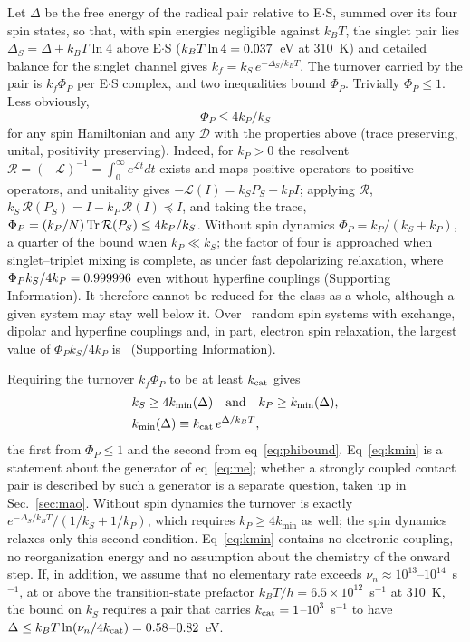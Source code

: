 \documentclass[aip,jcp,amsmath,amssymb,reprint]{revtex4-1}
\begin{document}
Let $\Delta$ be the free energy of the radical pair relative to E$\cdot$S, summed
over its four spin states, so that, with spin energies negligible against
$k_BT$, the singlet pair lies $\Delta_S = \Delta + k_BT\ln 4$ above E$\cdot$S
($k_BT\ln4 = 0.037$~eV at 310~K) and detailed balance for the singlet channel gives
$k_f = k_S\,e^{-\Delta_S/k_BT}$. The turnover carried by the pair is $k_f\Phi_P$
per E$\cdot$S complex, and two inequalities bound $\Phi_P$. Trivially
$\Phi_P\le1$. Less obviously,
\begin{equation}
\Phi_P \le 4k_P/k_S
\label{eq:phibound}
\end{equation}
for any spin Hamiltonian and any $\mathcal D$ with the properties above
(trace preserving, unital, positivity preserving). Indeed,
for $k_P>0$ the resolvent
$\mathcal R = (-\mathcal L)^{-1} = \int_0^\infty e^{\mathcal Lt}dt$ exists and
maps positive operators to positive operators, and unitality gives
$-\mathcal L(I) = k_SP_S + k_PI$; applying $\mathcal R$,
$k_S\,\mathcal R(P_S) = I - k_P\,\mathcal R(I) \preceq I$, and taking the trace,
$\Phi_P = (k_P/N)\,{\rm Tr}\,\mathcal R(P_S)\le 4k_P/k_S$. Without spin
dynamics $\Phi_P = k_P/(k_S+k_P)$, a quarter of the bound when $k_P\ll k_S$;
the factor of four is approached when singlet--triplet mixing is complete, as
under fast depolarizing relaxation, where $\Phi_Pk_S/4k_P = 0.999996$ even
without hyperfine couplings (Supporting Information). It therefore cannot be
reduced for the class as a whole, although a given system may stay well below
it. Over
\nBoundTest\ random spin systems with exchange, dipolar and hyperfine couplings
and, in part, electron spin relaxation, the largest value of $\Phi_Pk_S/4k_P$ is
\maxBoundRatio\ (Supporting Information).

Requiring the turnover $k_f\Phi_P$ to be at least $k_{\rm cat}$ gives
\begin{equation}
\begin{split}
&k_S \ge 4k_{\min}(\Delta)\quad\text{and}\quad k_P \ge k_{\min}(\Delta),\\
&k_{\min}(\Delta)\equiv k_{\rm cat}\,e^{\Delta/k_BT},
\end{split}
\label{eq:kmin}
\end{equation}
the first from $\Phi_P\le1$ and the second from eq~\ref{eq:phibound}.
Eq~\ref{eq:kmin} is a statement about the generator of
eq~\ref{eq:me}; whether a strongly coupled contact pair is described by such a
generator is a separate question, taken up in Sec.~\ref{sec:mao}. Without
spin dynamics the turnover is exactly $e^{-\Delta_S/k_BT}/(1/k_S+1/k_P)$, which
requires $k_P\ge4k_{\min}$ as well; the spin dynamics relaxes only this
second condition. Eq~\ref{eq:kmin} contains no electronic
coupling, no reorganization energy and no assumption about the chemistry of the
onward step. If, in addition, we assume that no elementary rate exceeds
$\nu_n\approx10^{13}$--$10^{14}$~s$^{-1}$, at or above the transition-state
prefactor $k_BT/h = 6.5\times10^{12}$~s$^{-1}$ at 310~K,\cite{Eyring1935} the bound on $k_S$ requires a pair that carries
$k_{\rm cat} = 1$--$10^3$~s$^{-1}$ to have
$\Delta\le k_BT\ln(\nu_n/4k_{\rm cat}) = 0.58$--$0.82$~eV.
\end{document}
